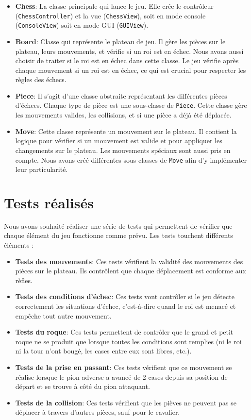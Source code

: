 \documentclass[12pt]{article}
\begin{document}
\begin{itemize}
    \item \textbf{Chess}: La classe principale qui lance le jeu. Elle crée le contrôleur (\texttt{ChessController}) et la vue (\texttt{ChessView}), soit en mode console (\texttt{ConsoleView}) soit en mode GUI (\texttt{GUIView}).
    \item \textbf{Board}: Classe qui représente le plateau de jeu. Il gère les pièces sur le plateau, leurs mouvements, et vérifie si un roi est en échec. Nous avons aussi choisir de traiter si le roi est en échec dans cette classe. Le jeu vérifie après chaque mouvement si un roi est en échec, ce qui est crucial pour respecter les règles des échecs.
    \item \textbf{Piece}: Il s'agit d'une classe abstraite représentant les différentes pièces d'échecs. Chaque type de pièce est une sous-classe de \texttt{Piece}. Cette classe gère les mouvements valides, les collisions, et si une pièce a déjà été déplacée.
    \item \textbf{Move}: Cette classe représente un mouvement sur le plateau. Il contient la logique pour vérifier si un mouvement est valide et pour appliquer les changements sur le plateau. Les mouvements spéciaux sont aussi pris en compte. Nous avons créé différentes sous-classes de \texttt{Move} afin d'y implémenter leur particularité. 
\end{itemize}

\section{Tests réalisés}
Nous avons souhaité réaliser une série de tests qui permettent de vérifier que chaque élément du jeu fonctionne comme prévu. Les tests touchent différents éléments :

\begin{itemize}
    \item \textbf{Tests des mouvements}: Ces tests vérifient la validité des mouvements des pièces sur le plateau. Ils contrôlent que chaque déplacement est conforme aux rèfles.
    \item \textbf{Tests des conditions d'échec}: Ces tests vont contrôler si le jeu détecte correctement les situations d'échec, c'est-à-dire quand le roi est menacé et empêche tout autre mouvement.
    \item \textbf{Tests du roque}: Ces tests permettent de contrôler que le grand et petit roque ne se produit que lorsque toutes les conditions sont remplies (ni le roi ni la tour n'ont bougé, les cases entre eux sont libres, etc.).
    \item \textbf{Tests de la prise en passant}: Ces tests vérifient que ce mouvement se réalise lorsque le pion adverse a avancé de 2 cases depuis sa position de départ et se trouve à côté du pion attaquant.
    \item \textbf{Tests de la collision}: Ces tests vérifient que les pièves ne peuvent pas se déplacer à travers d'autres pièces, sauf pour le cavalier.

\end{itemize}
\end{document}
